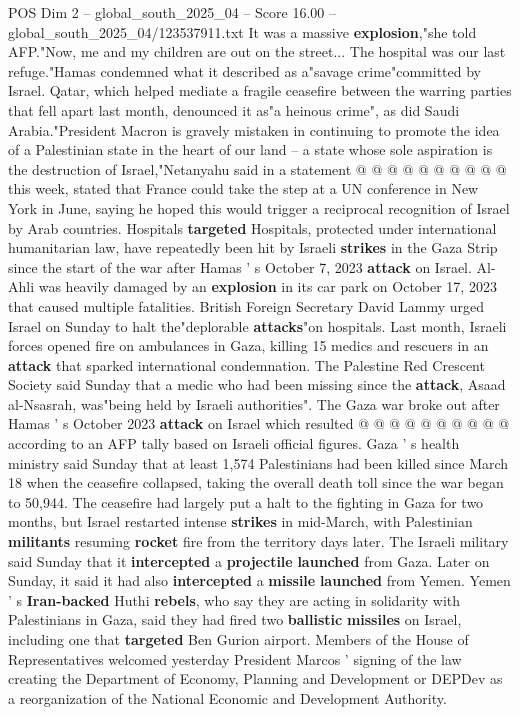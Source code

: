 \begin{textsample}{POS Dim 2 – global\_south\_2025\_04 – Score 16.00 – global\_south\_2025\_04/123537911.txt}
It was a massive \textbf{explosion},"she told AFP."Now, me and my children are out on the street...
The hospital was our last refuge."Hamas condemned what it described as a"savage crime"committed by Israel.
Qatar, which helped mediate a fragile ceasefire between the warring parties that fell apart last month, denounced it as"a heinous crime", as did Saudi Arabia."President Macron is gravely mistaken in continuing to promote the idea of a Palestinian state in the heart of our land -- a state whose sole aspiration is the destruction of Israel,"Netanyahu said in a statement @ @ @ @ @ @ @ @ @ @ this week, stated that France could take the step at a UN conference in New York in June, saying he hoped this would trigger a reciprocal recognition of Israel by Arab countries.
Hospitals \textbf{targeted} Hospitals, protected under international humanitarian law, have repeatedly been hit by Israeli \textbf{strikes} in the Gaza Strip since the start of the war after Hamas ' s October 7, 2023 \textbf{attack} on Israel.
Al-Ahli was heavily damaged by an \textbf{explosion} in its car park on October 17, 2023 that caused multiple fatalities.
British Foreign Secretary David Lammy urged Israel on Sunday to halt the"deplorable \textbf{attacks}"on hospitals.
Last month, Israeli forces opened fire on ambulances in Gaza, killing 15 medics and rescuers in an \textbf{attack} that sparked international condemnation.
The Palestine Red Crescent Society said Sunday that a medic who had been missing since the \textbf{attack}, Asaad al-Nsasrah, was"being held by Israeli authorities".
The Gaza war broke out after Hamas ' s October 2023 \textbf{attack} on Israel which resulted @ @ @ @ @ @ @ @ @ @ according to an AFP tally based on Israeli official figures.
Gaza ' s health ministry said Sunday that at least 1,574 Palestinians had been killed since March 18 when the ceasefire collapsed, taking the overall death toll since the war began to 50,944.
The ceasefire had largely put a halt to the fighting in Gaza for two months, but Israel restarted intense \textbf{strikes} in mid-March, with Palestinian \textbf{militants} resuming \textbf{rocket} fire from the territory days later.
The Israeli military said Sunday that it \textbf{intercepted} a \textbf{projectile} \textbf{launched} from Gaza.
Later on Sunday, it said it had also \textbf{intercepted} a \textbf{missile} \textbf{launched} from Yemen.
Yemen ' s \textbf{Iran-backed} Huthi \textbf{rebels}, who say they are acting in solidarity with Palestinians in Gaza, said they had fired two \textbf{ballistic} \textbf{missiles} on Israel, including one that \textbf{targeted} Ben Gurion airport.
Members of the House of Representatives welcomed yesterday President Marcos ' signing of the law creating the Department of Economy, Planning and Development or DEPDev as a reorganization of the National Economic and Development Authority.

\end{textsample}
